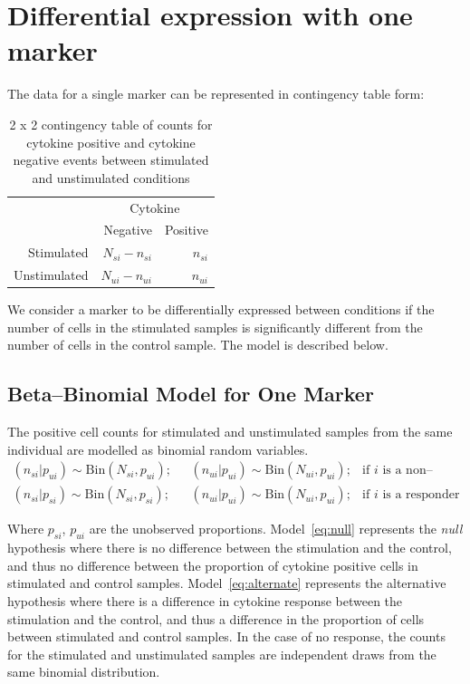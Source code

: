 \documentclass[11pt]{article}
\begin{document}
\section{Differential expression with one marker}
The data for a single marker can be represented in contingency table form:

\begin{table}[ht]
\centering
\parbox{0.8\linewidth}{
\caption{2 x 2 contingency table of counts for cytokine positive and cytokine negative events between stimulated and unstimulated conditions}\label{tab:twobytwo}
\centering
\begin{tabular}{rrr}

  \hline
\multicolumn{1}{l}{}&
\multicolumn{2}{c}{Cytokine}\\
 & Negative & Positive \\ 
  \hline
Stimulated &   $N_{si} - n_{si}$ &   $n_{si}$ \\ 
Unstimulated &   $N_{ui}-n_{ui}$ &   $n_{ui}$ \\ 
   \hline
\end{tabular}
}
\end{table}
We consider a marker to be differentially expressed between conditions if the number of cells in the stimulated samples is significantly different from the number of cells in the control sample. The model is described below.

\subsection{Beta--Binomial Model for One Marker}
The positive cell counts for stimulated and unstimulated samples from the same individual are modelled as  binomial random variables.
\begin{align}
(n_{si}|p_{ui}) \sim \mathrm{Bin}(N_{si},p_{ui});\text{ }& (n_{ui}|p_{ui}) \sim \mathrm{Bin}(N_{ui},p_{ui})\label{eq:null};&\text{if $i$ is a non--responder}\\
(n_{si}|p_{si}) \sim \mathrm{Bin}(N_{si},p_{si});\text{ }& (n_{ui}|p_{ui}) \sim \mathrm{Bin}(N_{ui},p_{ui});&\text{if $i$ is a responder}\label{eq:alternate}
 \end{align}
 
Where $p_{si}$, $p_{ui}$ are the unobserved proportions. Model~\eqref{eq:null} represents the \textit{null} hypothesis where there is no difference between the stimulation and the control, and thus no difference between the proportion of cytokine positive cells in stimulated and control samples. Model~\eqref{eq:alternate} represents the  alternative hypothesis where there is a difference in cytokine response between the stimulation and the control, and thus a difference in the proportion of cells between stimulated and control samples. In the case of no response, the counts for the stimulated and unstimulated samples are independent draws from the same  binomial distribution. 
\end{document}
